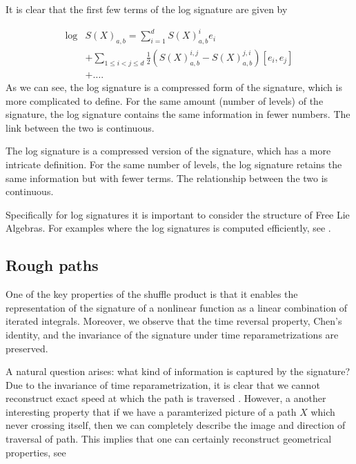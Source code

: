It is clear that the first few terms of the log signature are given by

\begin{equation}
    \begin{aligned}
\log&  S(X)_{a,b}  = \sum_{i=1}^{d} S(X)^i_{a,b} e_i \\  &+ \sum_{1 \leq i < j \leq d} \frac{1}{2} \left( S(X)^{i,j}_{a,b}  - S(X)^{j,i}_{a,b} \right) [e_i, e_j] \\ &  + \dots .
    \end{aligned}
\end{equation}
As we can see, the log signature is a compressed form of the signature, which is more complicated to define. For the same amount (number of levels) of the signature, the log signature contains the same information in fewer numbers. The link between the two is continuous.

The log signature is a compressed version of the signature, which has a more intricate definition. For the same number of levels, the log signature retains the same information but with fewer terms. The relationship between the two is continuous.

Specifically for log signatures it is important to consider the structure of Free Lie Algebras. For examples where the log signatures is computed efficiently, see \cite{reizenstein2020algorithm, reizenstein2017calculation}.


\subsection{Rough paths}%
\label{sub:rough_paths}


One of the key properties of the shuffle product is that it enables the representation of the signature of a nonlinear function as a linear combination of iterated integrals. Moreover, we observe that the time reversal property, Chen's identity, and the invariance of the signature under time reparametrizations are preserved.

A natural question arises: what kind of information is captured by the signature?
Due to the invariance of time reparametrization, it is clear that we cannot reconstruct exact speed at which the path is traversed \cite{chevyrev2016primer}.
However, a another interesting property that if we have a paramterized picture of a path $X$ which never crossing itself, then we can completely describe the image and direction of traversal of path. This implies that one can certainly
reconstruct geometrical properties, see \cite{lyons2017hyperbolic, chang2019insertion, geng2017reconstruction}




